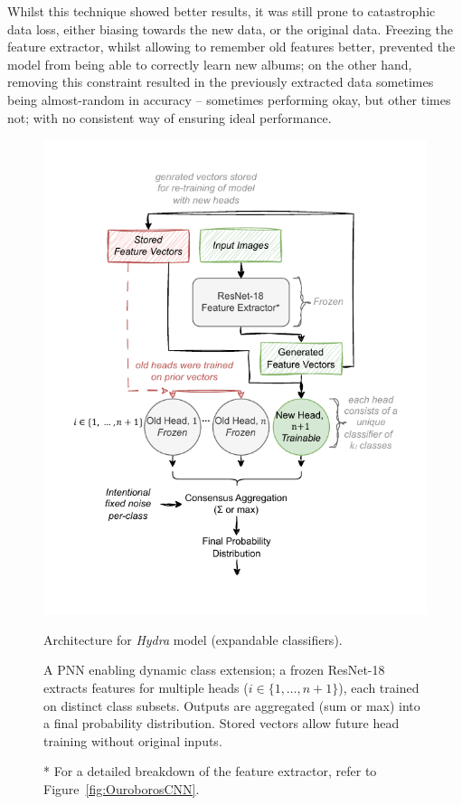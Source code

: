                 Whilst this technique showed better results, it was still prone to catastrophic data loss, either biasing towards the new data, or the original data. Freezing the feature extractor, whilst allowing to remember old features better, prevented the model from being able to correctly learn new albums; on the other hand, removing this constraint resulted in the previously extracted data sometimes being almost-random in accuracy -- sometimes performing okay, but other times not; with no consistent way of ensuring ideal performance.
    
                \begin{figure}[h]
                    \centering
                    \includegraphics[width=0.75\linewidth]{images/Hydra.pdf}
                    \caption{Architecture for \textit{Hydra} model (expandable classifiers).}
                    \label{fig:HydraCNN}
                    \caption*{
                        A PNN enabling dynamic class extension; a frozen ResNet-18 extracts features for multiple heads (\(i \in \{1, \dots, n+1\}\)), each trained on distinct class subsets. Outputs are aggregated (sum or max) into a final probability distribution. Stored vectors allow future head training without original inputs.
                    }
                    \caption*{* For a detailed breakdown of the feature extractor, refer to Figure~\ref{fig:OuroborosCNN}.}
                \end{figure}
    

